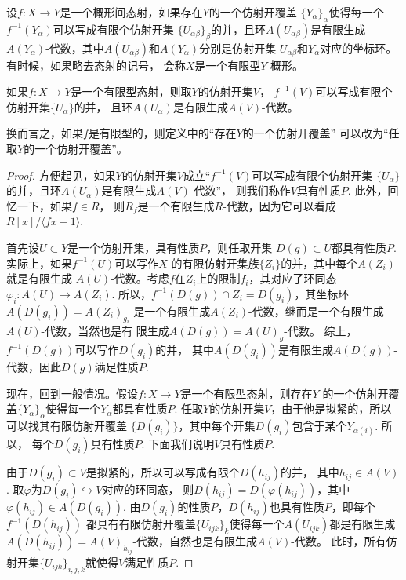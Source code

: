 \begin{para}[有限型态射]
设$f:X\to Y$是一个概形间态射，如果存在$Y$的一个仿射开覆盖
$\{Y_\alpha\}_\alpha$使得每一个$f^{-1}(Y_\alpha)$可以写成有限个仿射开集
$\{U_{\alpha\beta}\}_\beta$的并，且环$A(U_{\alpha\beta})$是有限生成
$A(Y_\alpha)$-代数，其中$A(U_{\alpha\beta})$和$A(Y_\alpha)$分别是仿射开集
$U_{\alpha\beta}$和$Y_\alpha$对应的坐标环。有时候，如果略去态射的记号，
会称$X$是一个有限型$Y$-概形。
\end{para}

\begin{pro}
	如果$f:X\to Y$是一个有限型态射，则取$Y$的仿射开集$V$，
	$f^{-1}(V)$可以写成有限个仿射开集$\{U_{\alpha}\}$的并，
	且环$A(U_{\alpha})$是有限生成$A(V)$-代数。
\end{pro}

换而言之，如果$f$是有限型的，则定义中的“存在$Y$的一个仿射开覆盖”
可以改为“任取$Y$的一个仿射开覆盖”。

\begin{proof}
	方便起见，如果$Y$的仿射开集$V$成立“$f^{-1}(V)$可以写成有限个仿射开集
	$\{U_{\alpha}\}$的并，且环$A(U_{\alpha})$是有限生成$A(V)$-代数”，
	则我们称作$V$具有性质$P$. 此外，回忆一下，如果$f\in R$，
	则$R_{f}$是一个有限生成$R$-代数，因为它可以看成
	$R[x]/\langle fx-1\rangle$.

	首先设$U\subset Y$是一个仿射开集，具有性质$P$，则任取开集
	$D(g)\subset U$都具有性质$P$. 实际上，如果$f^{-1}(U)$可以写作$X$
	的有限仿射开集族$\{Z_i\}$的并，其中每个$A(Z_i)$就是有限生成
	$A(U)$-代数。考虑$f$在$Z_i$上的限制$f_i$，其对应了环同态
	$\varphi_i:A(U)\to A(Z_i)$. 
	所以，$f^{-1}(D(g))\cap Z_i=D(g_i)$，其坐标环$A(D(g_i))=A(Z_i)_{g_i}$
	是一个有限生成$A(Z_i)$-代数，继而是一个有限生成$A(U)$-代数，当然也是有
	限生成$A(D(g))=A(U)_g$-代数。
	综上，$f^{-1}(D(g))$可以写作$D(g_i)$的并，
	其中$A(D(g_i))$是有限生成$A(D(g))$-代数，因此$D(g)$满足性质$P$.

	现在，回到一般情况。假设$f:X\to Y$是一个有限型态射，则存在$Y$
	的一个仿射开覆盖$\{Y_\alpha\}_\alpha$使得每一个$Y_\alpha$都具有性质$P$. 
	任取$Y$的仿射开集$V$，由于他是拟紧的，所以可以找其有限仿射开覆盖
	$\{D(g_i)\}$，其中每个开集$D(g_i)$包含于某个$Y_{\alpha(i)}$. 所以，
	每个$D(g_i)$具有性质$P$. 下面我们说明$V$具有性质$P$.
	
	由于$D(g_i)\subset V$是拟紧的，所以可以写成有限个$D(h_{ij})$的并，
	其中$h_{ij}\in A(V)$. 取$\varphi$为$D(g_i)\hookrightarrow V$对应的环同态，
	则$D(h_{ij})=D(\varphi(h_{ij}))$，其中$\varphi(h_{ij})\in A(D(g_i))$.
	由$D(g_i)$的性质$P$，$D(h_{ij})$也具有性质$P$，即每个$f^{-1}(D(h_{ij}))$
	都具有有限仿射开覆盖$\{U_{ijk}\}_k$使得每一个$A(U_{ijk})$都是有限生成
	$A(D(h_{ij}))=A(V)_{h_{ij}}$-代数，自然也是有限生成$A(V)$-代数。
	此时，所有仿射开集$\{U_{ijk}\}_{i,j,k}$就使得$V$满足性质$P$.
\end{proof}

